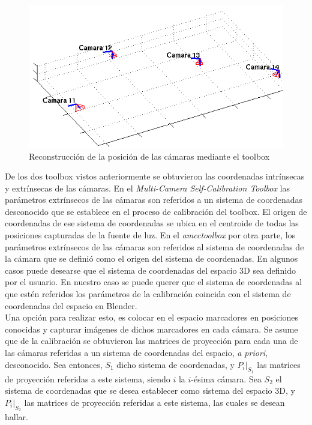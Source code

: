 \begin{figure}[ht!]
\begin{center}
\includegraphics[scale=0.7]{img/calibracion/tablero_cam_relevadas_4c.png}
\end{center}
\caption{Reconstrucción de la posición de las cámaras mediante el toolbox}
\label{fig: tablero_posicion_camaras}
\end{figure}

De los dos toolbox vistos anteriormente se obtuvieron las coordenadas intrínsecas y extrínsecas de las cámaras. En el \textit{Multi-Camera Self-Calibration Toolbox} las parámetros extrínsecos de las cámaras son referidos a un sistema de coordenadas desconocido que se establece en el proceso de calibración del toolbox. El origen de coordenadas de ese sistema de coordenadas se ubica en el centroide de todas las posiciones capturadas de la fuente de luz. En el \textit{amcctoolbox} por otra parte, los parámetros extrínsecos de las cámaras son referidos al sistema de coordenadas de la cámara que se definió como el origen del sistema de coordenadas. En algunos casos puede desearse que el sistema de coordenadas del espacio 3D sea definido por el usuario. En nuestro caso se puede querer que el sistema de coordenadas al que estén referidos los parámetros de la calibración coincida con el sistema de coordenadas del espacio en Blender.\\

Una opción para realizar esto, es colocar en el espacio marcadores en posiciones conocidas y capturar imágenes de dichos marcadores en cada cámara. Se asume que de la calibración se obtuvieron las matrices de proyección para cada una de las cámaras referidas a un sistema de coordenadas del espacio, \textit{a priori}, desconocido. Sea entonces, $S_1$ dicho sistema de coordenadas, y $P_i|_{S_1}$ las matrices de proyección referidas a este sistema, siendo $i$ la $i$-ésima cámara. Sea $S_2$ el sistema de coordenadas que se desea establecer como sistema del espacio 3D, y $P_i|_{S_2}$ las matrices de proyección referidas a este sistema, las cuales se desean hallar.\\

